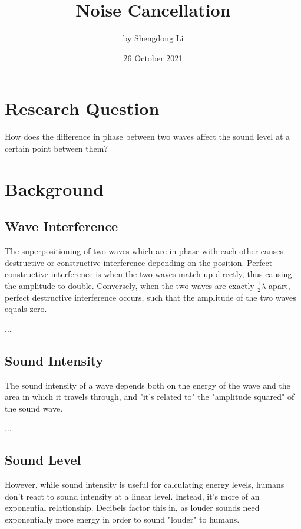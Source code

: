 \documentclass[12pt]{article}
\begin{document}
\title{Noise Cancellation}
\author{by Shengdong Li}
\date{26 October 2021}
\maketitle

\section{Research Question}

How does the difference in phase between two waves affect the sound level at a certain point between them?

\section{Background}

\subsection{Wave Interference}

The superpositioning of two waves which are in phase with each other causes destructive or constructive interference depending on the position. Perfect constructive interference is when the two waves match up directly, thus causing the amplitude to double. Conversely, when the two waves are exactly \(\frac{1}{2}\lambda\) apart, perfect destructive interference occurs, such that the amplitude of the two waves equals zero.

...

\subsection{Sound Intensity}

The sound intensity of a wave depends both on the energy of the wave and the area in which it travels through, and "it's related to" the "amplitude squared" of the sound wave.

...

\subsection{Sound Level}

However, while sound intensity is useful for calculating energy levels, humans don't react to sound intensity at a linear level. Instead, it's more of an exponential relationship. Decibels factor this in, as louder sounds need exponentially more energy in order to sound "louder" to humans.
\end{document}

